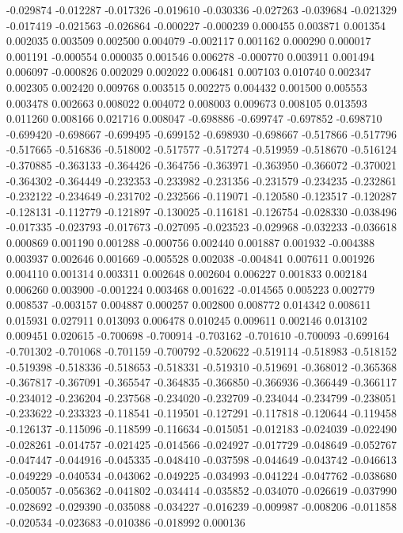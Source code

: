 -0.029874
-0.012287
-0.017326
-0.019610
-0.030336
-0.027263
-0.039684
-0.021329
-0.017419
-0.021563
-0.026864
-0.000227
-0.000239
0.000455
0.003871
0.001354
0.002035
0.003509
0.002500
0.004079
-0.002117
0.001162
0.000290
0.000017
0.001191
-0.000554
0.000035
0.001546
0.006278
-0.000770
0.003911
0.001494
0.006097
-0.000826
0.002029
0.002022
0.006481
0.007103
0.010740
0.002347
0.002305
0.002420
0.009768
0.003515
0.002275
0.004432
0.001500
0.005553
0.003478
0.002663
0.008022
0.004072
0.008003
0.009673
0.008105
0.013593
0.011260
0.008166
0.021716
0.008047
-0.698886
-0.699747
-0.697852
-0.698710
-0.699420
-0.698667
-0.699495
-0.699152
-0.698930
-0.698667
-0.517866
-0.517796
-0.517665
-0.516836
-0.518002
-0.517577
-0.517274
-0.519959
-0.518670
-0.516124
-0.370885
-0.363133
-0.364426
-0.364756
-0.363971
-0.363950
-0.366072
-0.370021
-0.364302
-0.364449
-0.232353
-0.233982
-0.231356
-0.231579
-0.234235
-0.232861
-0.232122
-0.234649
-0.231702
-0.232566
-0.119071
-0.120580
-0.123517
-0.120287
-0.128131
-0.112779
-0.121897
-0.130025
-0.116181
-0.126754
-0.028330
-0.038496
-0.017335
-0.023793
-0.017673
-0.027095
-0.023523
-0.029968
-0.032233
-0.036618
0.000869
0.001190
0.001288
-0.000756
0.002440
0.001887
0.001932
-0.004388
0.003937
0.002646
0.001669
-0.005528
0.002038
-0.004841
0.007611
0.001926
0.004110
0.001314
0.003311
0.002648
0.002604
0.006227
0.001833
0.002184
0.006260
0.003900
-0.001224
0.003468
0.001622
-0.014565
0.005223
0.002779
0.008537
-0.003157
0.004887
0.000257
0.002800
0.008772
0.014342
0.008611
0.015931
0.027911
0.013093
0.006478
0.010245
0.009611
0.002146
0.013102
0.009451
0.020615
-0.700698
-0.700914
-0.703162
-0.701610
-0.700093
-0.699164
-0.701302
-0.701068
-0.701159
-0.700792
-0.520622
-0.519114
-0.518983
-0.518152
-0.519398
-0.518336
-0.518653
-0.518331
-0.519310
-0.519691
-0.368012
-0.365368
-0.367817
-0.367091
-0.365547
-0.364835
-0.366850
-0.366936
-0.366449
-0.366117
-0.234012
-0.236204
-0.237568
-0.234020
-0.232709
-0.234044
-0.234799
-0.238051
-0.233622
-0.233323
-0.118541
-0.119501
-0.127291
-0.117818
-0.120644
-0.119458
-0.126137
-0.115096
-0.118599
-0.116634
-0.015051
-0.012183
-0.024039
-0.022490
-0.028261
-0.014757
-0.021425
-0.014566
-0.024927
-0.017729
-0.048649
-0.052767
-0.047447
-0.044916
-0.045335
-0.048410
-0.037598
-0.044649
-0.043742
-0.046613
-0.049229
-0.040534
-0.043062
-0.049225
-0.034993
-0.041224
-0.047762
-0.038680
-0.050057
-0.056362
-0.041802
-0.034414
-0.035852
-0.034070
-0.026619
-0.037990
-0.028692
-0.029390
-0.035088
-0.034227
-0.016239
-0.009987
-0.008206
-0.011858
-0.020534
-0.023683
-0.010386
-0.018992
0.000136
